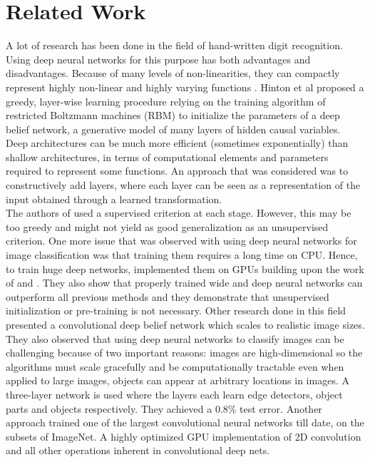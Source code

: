 \documentclass[10pt,twocolumn,letterpaper]{article}
\begin{document}
\section{Related Work}
A lot of research has been done in the field of hand-written digit recognition. Using deep neural networks for this purpose has both advantages and disadvantages. Because of many levels of non-linearities, they can compactly represent highly non-linear and highly varying functions \cite{Larochelle:2009:EST:1577069.1577070}. Hinton et al \cite{Hinton:2006:FLA:1161603.1161605} proposed a greedy, layer-wise learning procedure relying on the training algorithm of restricted Boltzmann machines (RBM) to initialize the parameters of a deep belief network, a generative model of many layers of hidden causal variables. Deep architectures can be much more efficient (sometimes exponentially) than shallow architectures, in terms of computational elements and parameters required to represent some functions. An approach that was considered was to constructively add layers, where each layer can be seen as a representation of the input obtained through a learned transformation.\\

The authors of \cite{Fahlman:1990:CLA:109230.107380} used a supervised criterion at each stage. However, this may be too greedy and might not yield as good generalization as an unsupervised criterion. One more issue that was observed with using deep neural networks for image classification was that training them requires a long time on CPU. Hence, to train huge deep networks, \cite{Schmidhuber:2012:MDN:2354409.2354694} implemented them on GPUs building upon the work of \cite{Ciresan:2010:DBS:1943016.1943024} and \cite{Ciresan:2011:FHP:2283516.2283603}. They also show that properly trained wide and deep neural networks can outperform all previous methods and they demonstrate that unsupervised initialization or pre-training is not necessary. Other research \cite{Lee:2009:CDB:1553374.1553453} done in this field presented a convolutional deep belief network which scales to realistic image sizes. They also observed that using deep neural networks to classify images can be challenging because of two important reasons: images are high-dimensional so the algorithms must scale gracefully and be computationally tractable even when applied to large images, objects can appear at arbitrary locations in images. A three-layer network is used where the layers each learn edge detectors, object parts and objects respectively. They achieved a 0.8\% test error. Another approach \cite{NIPS2012_4824} trained one of the largest convolutional neural networks till date, on the subsets of ImageNet. A highly optimized GPU implementation of 2D convolution and all other operations inherent in convolutional deep nets.
\end{document}
